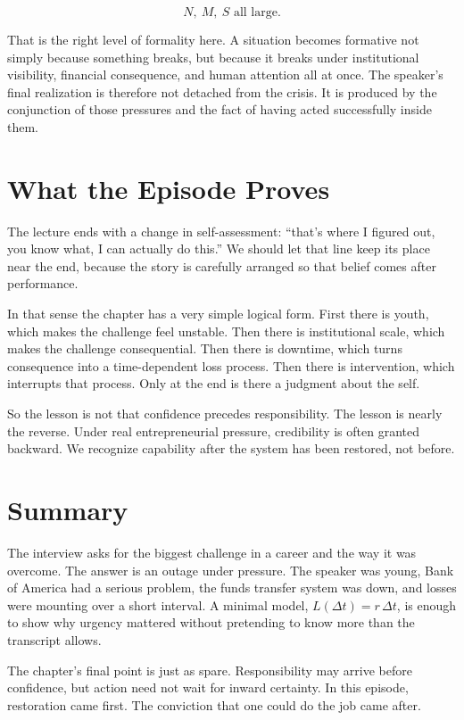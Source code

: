\begin{equation}
N,\ M,\ S \text{ all large.}
\end{equation}

That is the right level of formality here. A situation becomes formative not simply because something breaks, but because it breaks under institutional visibility, financial consequence, and human attention all at once. The speaker's final realization is therefore not detached from the crisis. It is produced by the conjunction of those pressures and the fact of having acted successfully inside them.

\section{What the Episode Proves}

The lecture ends with a change in self-assessment: ``that's where I figured out, you know what, I can actually do this.'' We should let that line keep its place near the end, because the story is carefully arranged so that belief comes after performance.

In that sense the chapter has a very simple logical form. First there is youth, which makes the challenge feel unstable. Then there is institutional scale, which makes the challenge consequential. Then there is downtime, which turns consequence into a time-dependent loss process. Then there is intervention, which interrupts that process. Only at the end is there a judgment about the self.

So the lesson is not that confidence precedes responsibility. The lesson is nearly the reverse. Under real entrepreneurial pressure, credibility is often granted backward. We recognize capability after the system has been restored, not before.

\section{Summary}

The interview asks for the biggest challenge in a career and the way it was overcome. The answer is an outage under pressure. The speaker was young, Bank of America had a serious problem, the funds transfer system was down, and losses were mounting over a short interval. A minimal model,
\(L(\Delta t)=r\,\Delta t\),
is enough to show why urgency mattered without pretending to know more than the transcript allows.

The chapter's final point is just as spare. Responsibility may arrive before confidence, but action need not wait for inward certainty. In this episode, restoration came first. The conviction that one could do the job came after.